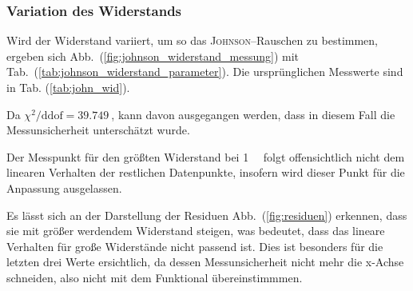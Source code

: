 \documentclass[sn-mathphys-num,iicol]{sn-jnl}
\theoremstyle{thmstyleone}
\theoremstyle{thmstyletwo}
\theoremstyle{thmstylethree}
\begin{document}
\subsubsection{Variation des Widerstands}
Wird der Widerstand variiert, um so das \textsc{Johnson}--Rauschen zu bestimmen, ergeben sich Abb.\ (\ref{fig:johnson_widerstand_messung}) mit Tab.\ (\ref{tab:johnson_widerstand_parameter}). Die ursprünglichen Messwerte sind in Tab. (\ref{tab:john_wid}).

Da $\chi^2/\text{ddof}=\SI{39.749}{}$, kann davon ausgegangen werden, dass in diesem Fall die Messunsicherheit unterschätzt wurde.

Der Messpunkt für den größten Widerstand bei \SI{1}{\mega \Omega} folgt offensichtlich nicht dem linearen Verhalten der restlichen Datenpunkte, insofern wird dieser Punkt für die Anpassung ausgelassen.

Es lässt sich an der Darstellung der Residuen Abb.\ (\ref{fig:residuen}) erkennen, dass sie mit größer werdendem Widerstand steigen, was bedeutet, dass das lineare Verhalten für große Widerstände nicht passend ist. Dies ist besonders für die letzten drei Werte ersichtlich, da dessen Messunsicherheit nicht mehr die x-Achse schneiden, also nicht mit dem Funktional übereinstimmmen.
\end{document}
